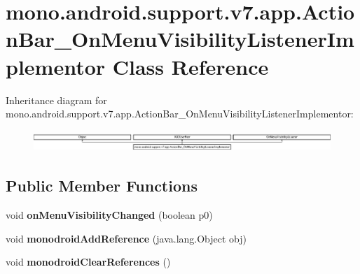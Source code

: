 \hypertarget{classmono_1_1android_1_1support_1_1v7_1_1app_1_1_action_bar___on_menu_visibility_listener_implementor}{}\section{mono.\+android.\+support.\+v7.\+app.\+Action\+Bar\+\_\+\+On\+Menu\+Visibility\+Listener\+Implementor Class Reference}
\label{classmono_1_1android_1_1support_1_1v7_1_1app_1_1_action_bar___on_menu_visibility_listener_implementor}
Inheritance diagram for mono.\+android.\+support.\+v7.\+app.\+Action\+Bar\+\_\+\+On\+Menu\+Visibility\+Listener\+Implementor\+:\begin{figure}[H]
\begin{center}
\leavevmode
\includegraphics[height=0.809834cm]{classmono_1_1android_1_1support_1_1v7_1_1app_1_1_action_bar___on_menu_visibility_listener_implementor}
\end{center}
\end{figure}
\subsection*{Public Member Functions}
\begin{DoxyCompactItemize}
\item 
\mbox{\label{classmono_1_1android_1_1support_1_1v7_1_1app_1_1_action_bar___on_menu_visibility_listener_implementor_a273ad4963b11410f46b1e918b47526e5}} 
void {\bfseries on\+Menu\+Visibility\+Changed} (boolean p0)
\item 
\mbox{\label{classmono_1_1android_1_1support_1_1v7_1_1app_1_1_action_bar___on_menu_visibility_listener_implementor_a120bb639390d4992edfcf6749c839108}} 
void {\bfseries monodroid\+Add\+Reference} (java.\+lang.\+Object obj)
\item 
\mbox{\label{classmono_1_1android_1_1support_1_1v7_1_1app_1_1_action_bar___on_menu_visibility_listener_implementor_a888aa1c7efc221057deab7c4d44d1e86}} 
void {\bfseries monodroid\+Clear\+References} ()
\end{DoxyCompactItemize}
